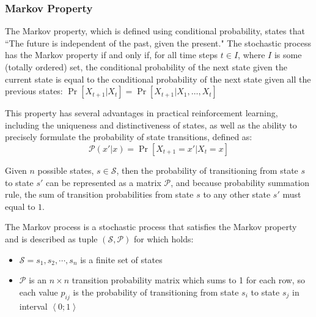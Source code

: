 \documentclass[../xlapes02]{subfiles}
\begin{document}
    \subsubsection{Markov Property}\label{subsubsec:markov-property}
    The Markov property, which is defined using conditional probability, states that ``The future is independent of the past, given the present."
    The stochastic process has the Markov property if and only if, for all time steps $t \in I$, where $I$ is some (totally ordered) set, the conditional probability of the next state given the current state is equal to the conditional probability of the next state given all the previous states: $\Pr\left[X_{t+1}|X_t\right] = \Pr\left[X_{t+1}|X_1,\ldots,X_t\right]$

    This property has several advantages in practical reinforcement learning, including the uniqueness and distinctiveness of states, as well as the ability to precisely formulate the probability of state transitions, defined as:~\cite{FITMT25127}
    \begin{equation}
        \mathcal{P}(x'|x)=\Pr\left[X_{t+1}=x'|X_t=x\right]
    \end{equation}

    Given $n$ possible states, $s\in \mathcal{S}$, then the probability of transitioning from state $s$ to state $s'$ can be represented as a matrix $\mathcal{P}$, and because probability summation rule, the sum of transition probabilities from state $s$ to any other state $s'$ must equal to $1$.

    \begin{definition}
        The Markov process is a stochastic process that satisfies the Markov property and is described as tuple $\left(\mathcal{S}, \mathcal{P}\right)$ for which holds:\cite{ABATE2021102207}
        \begin{itemize}
            \item $\mathcal{S}=s_1,s_2,\cdots,s_n$ is a finite set of states
            \item $\mathcal{P}$ is an $n\times n$ transition probability matrix which sums to 1 for each row, so each value $p_{ij}$ is the probability of transitioning from state $s_i$ to state $s_j$ in interval $\left< 0;1 \right>$
        \end{itemize}
    \end{definition}
\end{document}
